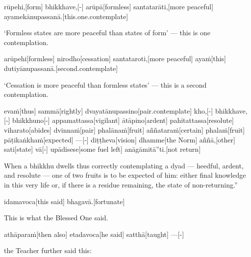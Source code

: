 \begin{samepage}
\begingl[glneveryline={\PaliGlossA,\PaliGlossB}]
rūpehi,[form] bhikkhave,[-] arūpā[formless] santatarāti,[more peaceful] ayamekānupassanā.[this.one.contemplate]
\endgl
\nopagebreak
\linespread{0.5}
\begin{spacin}{0.2}
{\PaliGlossFT ‘Formless states are more peaceful than states of form’ — this is one contemplation.}
\end{spacin}
\vskip 12pt
\end{samepage}
\begin{samepage}
\begingl[glneveryline={\PaliGlossA,\PaliGlossB}]
arūpehi[formless] nirodho[cessation] santataroti,[more peaceful] ayaṁ[this] dutiyānupassanā.[second.contemplate]
\endgl
\nopagebreak
\linespread{0.5}
\begin{spacin}{0.2}
{\PaliGlossFT [147] ‘Cessation is more peaceful than formless states’ — this is a second contemplation.}
\end{spacin}
\vskip 12pt
\end{samepage}
\begin{samepage}
\begingl[glneveryline={\PaliGlossA,\PaliGlossB}]
evaṁ[thus] sammā[rightly] dvayatānupassino[pair.contemplate] kho,[-] bhikkhave,[-] bhikkhuno[-] appamattassa[vigilant] ātāpino[ardent] pahitattassa[resolute] viharato[abides] dvinnaṁ[pair] phalānaṁ[fruit] aññataraṁ[certain] phalaṁ[fruit] pāṭikaṅkhaṁ[expected] —[-] diṭṭheva[vision] dhamme[the Norm] aññā,[other] sati[state] vā[-] upādisese[some fuel left] anāgāmitā”ti.[not return]
\endgl
\nopagebreak
\linespread{0.5}
\begin{spacin}{0.2}
{\PaliGlossFT When a bhikkhu dwells thus correctly contemplating a dyad — heedful, ardent, and resolute — one of two fruits is to be expected of him: either final knowledge in this very life or, if there is a residue remaining, the state of non-returning.”}
\end{spacin}
\vskip 12pt
\end{samepage}
\begin{samepage}
\begingl[glneveryline={\PaliGlossA,\PaliGlossB}]
idamavoca[this said] bhagavā.[fortunate]
\endgl
\nopagebreak
\linespread{0.5}
\begin{spacin}{0.2}
{\PaliGlossFT This is what the Blessed One said.}
\end{spacin}
\vskip 12pt
\end{samepage}
\begin{samepage}
\begingl[glneveryline={\PaliGlossA,\PaliGlossB}]
athāparaṁ[then also] etadavoca[he said] satthā[taught] —[-]
\endgl
\nopagebreak
\linespread{0.5}
\begin{spacin}{0.2}
{\PaliGlossFT the Teacher further said this:}
\end{spacin}
\vskip 12pt
\end{samepage}

